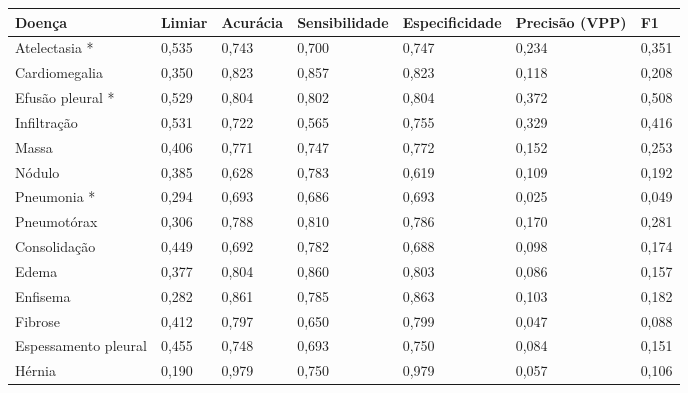 \begin{tabular}{lllllll}
\toprule
Doença & Limiar & Acurácia & Sensibilidade & Especificidade & Precisão (VPP) & F1 \\
\midrule
Atelectasia * & 0,535 & 0,743 & 0,700 & 0,747 & 0,234 & 0,351 \\
Cardiomegalia & 0,350 & 0,823 & 0,857 & 0,823 & 0,118 & 0,208 \\
Efusão pleural * & 0,529 & 0,804 & 0,802 & 0,804 & 0,372 & 0,508 \\
Infiltração & 0,531 & 0,722 & 0,565 & 0,755 & 0,329 & 0,416 \\
Massa & 0,406 & 0,771 & 0,747 & 0,772 & 0,152 & 0,253 \\
Nódulo & 0,385 & 0,628 & 0,783 & 0,619 & 0,109 & 0,192 \\
Pneumonia * & 0,294 & 0,693 & 0,686 & 0,693 & 0,025 & 0,049 \\
Pneumotórax & 0,306 & 0,788 & 0,810 & 0,786 & 0,170 & 0,281 \\
Consolidação & 0,449 & 0,692 & 0,782 & 0,688 & 0,098 & 0,174 \\
Edema & 0,377 & 0,804 & 0,860 & 0,803 & 0,086 & 0,157 \\
Enfisema & 0,282 & 0,861 & 0,785 & 0,863 & 0,103 & 0,182 \\
Fibrose & 0,412 & 0,797 & 0,650 & 0,799 & 0,047 & 0,088 \\
Espessamento pleural & 0,455 & 0,748 & 0,693 & 0,750 & 0,084 & 0,151 \\
Hérnia & 0,190 & 0,979 & 0,750 & 0,979 & 0,057 & 0,106 \\
\bottomrule
\end{tabular}
